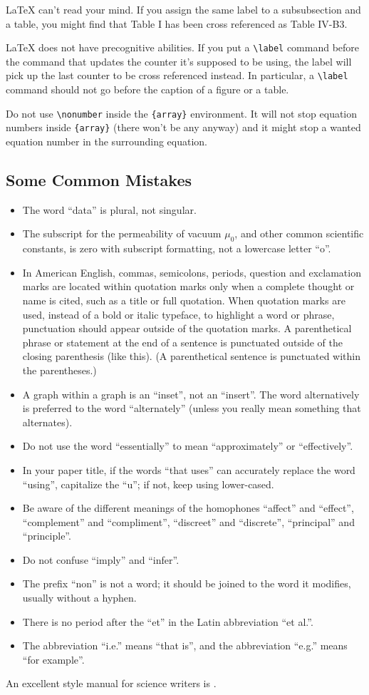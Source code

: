\documentclass[conference]{IEEEtran}
\begin{document}
{\LaTeX} can't read your mind. If you assign the same label to a
subsubsection and a table, you might find that Table I has been cross
referenced as Table IV-B3. 

{\LaTeX} does not have precognitive abilities. If you put a
\verb|\label| command before the command that updates the counter it's
supposed to be using, the label will pick up the last counter to be
cross referenced instead. In particular, a \verb|\label| command
should not go before the caption of a figure or a table.

Do not use \verb|\nonumber| inside the \verb|{array}| environment. It
will not stop equation numbers inside \verb|{array}| (there won't be
any anyway) and it might stop a wanted equation number in the
surrounding equation.

\subsection{Some Common Mistakes}\label{SCM}
\begin{itemize}
\item The word ``data'' is plural, not singular.
\item The subscript for the permeability of vacuum $\mu_{0}$, and other common scientific constants, is zero with subscript formatting, not a lowercase letter ``o''.
\item In American English, commas, semicolons, periods, question and exclamation marks are located within quotation marks only when a complete thought or name is cited, such as a title or full quotation. When quotation marks are used, instead of a bold or italic typeface, to highlight a word or phrase, punctuation should appear outside of the quotation marks. A parenthetical phrase or statement at the end of a sentence is punctuated outside of the closing parenthesis (like this). (A parenthetical sentence is punctuated within the parentheses.)
\item A graph within a graph is an ``inset'', not an ``insert''. The word alternatively is preferred to the word ``alternately'' (unless you really mean something that alternates).
\item Do not use the word ``essentially'' to mean ``approximately'' or ``effectively''.
\item In your paper title, if the words ``that uses'' can accurately replace the word ``using'', capitalize the ``u''; if not, keep using lower-cased.
\item Be aware of the different meanings of the homophones ``affect'' and ``effect'', ``complement'' and ``compliment'', ``discreet'' and ``discrete'', ``principal'' and ``principle''.
\item Do not confuse ``imply'' and ``infer''.
\item The prefix ``non'' is not a word; it should be joined to the word it modifies, usually without a hyphen.
\item There is no period after the ``et'' in the Latin abbreviation ``et al.''.
\item The abbreviation ``i.e.'' means ``that is'', and the abbreviation ``e.g.'' means ``for example''.
\end{itemize}
An excellent style manual for science writers is \cite{b7}.
\end{document}
